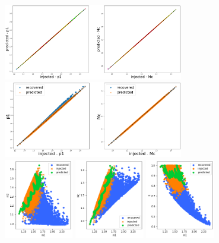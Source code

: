 \documentclass[prd,aps,twocolumn,a4paper,showkeys,nofootinbib]{article}
\begin{document}
%
\begin{figure}[]
  \center
  \includegraphics[width=0.7\textwidth]{./Figs/GstLAL_p_regression.png}
  \includegraphics[width=0.7\textwidth]{./Figs/GstLAL_p_regression_noise.png}\\
  \includegraphics[width=0.27\textwidth]{./Figs/GstLAL_p_m2.png}
  \includegraphics[width=0.27\textwidth]{./Figs/GstLAL_p_Mc.png}
  \includegraphics[width=0.27\textwidth]{./Figs/GstLAL_p_q.png}\\

\end{figure}
\end{document}
